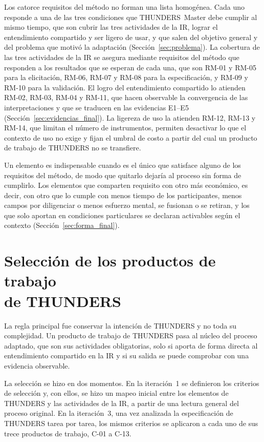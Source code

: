 \documentclass[12pt,letterpaper,oneside]{report}
\begin{document}
Los catorce requisitos del método no forman una lista homogénea. Cada uno responde a una
de las tres condiciones que THUNDERS~Master debe cumplir al mismo tiempo, que son
cubrir las tres actividades de la IR, lograr el entendimiento compartido y ser
ligero de usar, y que salen del objetivo general y del problema que motivó la
adaptación (Sección~\ref{sec:problema}).
La cobertura de las tres actividades de la IR se asegura mediante requisitos del método
que responden a los resultados que se esperan de cada una,
 que son RM-01 y RM-05 para la elicitación, RM-06, RM-07 y RM-08 para
la especificación, y RM-09 y RM-10 para la validación. El logro del entendimiento
compartido lo atienden RM-02, RM-03, RM-04 y RM-11, que hacen observable la
convergencia de las interpretaciones y que se traducen en las evidencias E1--E5
(Sección~\ref{sec:evidencias_final}). La ligereza de uso la atienden RM-12, RM-13 y RM-14, que
limitan el número de instrumentos, permiten desactivar lo que el contexto de uso no
exige y fijan el umbral de costo a partir del cual un producto de trabajo de THUNDERS no se
transfiere.

Un elemento es indispensable cuando es el
único que satisface alguno de los requisitos del método, de modo que quitarlo dejaría al
proceso sin forma de cumplirlo. Los elementos que comparten requisito con otro
más económico, es decir, con otro que lo cumple con menos tiempo de los
participantes, menos campos por diligenciar o menos esfuerzo mental, se fusionan
o se retiran, y los que solo aportan en condiciones
particulares se declaran activables según el contexto (Sección~\ref{sec:forma_final}).

\section[Selección de los productos de trabajo de THUNDERS]{Selección de los productos de trabajo\\ de THUNDERS}
\label{sec:seleccion}
La regla principal fue conservar la intención de
THUNDERS y no toda su complejidad. Un producto de trabajo de THUNDERS pasa al núcleo del proceso
adaptado, que son sus actividades obligatorias, solo si aporta de forma directa
al entendimiento compartido en la IR y si su salida se puede comprobar con una
evidencia observable.

La selección se hizo en dos momentos. En la iteración~1 se definieron los
criterios de selección y, con ellos, se hizo un mapeo inicial entre los elementos
de THUNDERS y las actividades de la IR, a partir de una lectura general del
proceso original. En la iteración~3, una vez analizada la especificación de
THUNDERS tarea por tarea, los mismos criterios se aplicaron a cada uno de sus
trece productos de trabajo, C-01 a C-13. 
\end{document}
